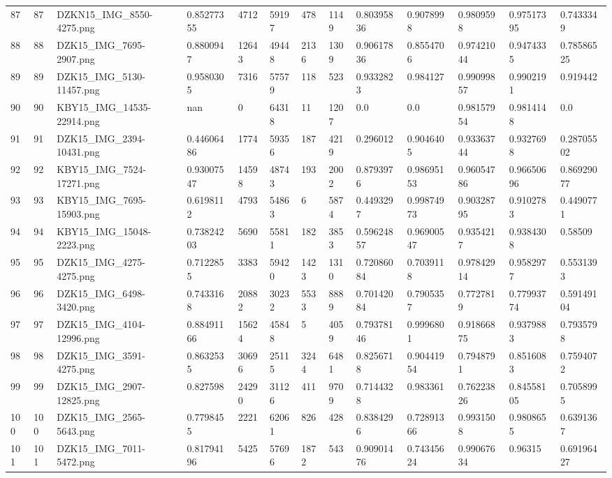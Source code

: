 \documentclass[11pt, a4paper, twoside]{report}
\begin{document}
\begin{longtable}[c]{@{}lllllllllllll@{}}
87 & 87 & DZKN15\_IMG\_8550-4275.png & 0.85277355 & 4712 & 59197 & 478 & 1149 & 0.80395836 & 0.9078998 & 0.9809598 & 0.97517395 & 0.7433349 \\
88 & 88 & DZK15\_IMG\_7695-2907.png & 0.8800947 & 12643 & 49448 & 2136 & 1309 & 0.90617836 & 0.8554706 & 0.97421044 & 0.9474335 & 0.78586525 \\
89 & 89 & DZK15\_IMG\_5130-11457.png & 0.9580305 & 7316 & 57579 & 118 & 523 & 0.9332823 & 0.984127 & 0.99099857 & 0.9902191 & 0.919442 \\
90 & 90 & KBY15\_IMG\_14535-22914.png & nan & 0 & 64318 & 11 & 1207 & 0.0 & 0.0 & 0.98157954 & 0.9814148 & 0.0 \\
91 & 91 & DZK15\_IMG\_2394-10431.png & 0.44606486 & 1774 & 59356 & 187 & 4219 & 0.296012 & 0.9046405 & 0.93363744 & 0.9327698 & 0.28705502 \\
92 & 92 & KBY15\_IMG\_7524-17271.png & 0.93007547 & 14598 & 48743 & 193 & 2002 & 0.8793976 & 0.98695153 & 0.96054786 & 0.96650696 & 0.86929077 \\
93 & 93 & KBY15\_IMG\_7695-15903.png & 0.6198112 & 4793 & 54863 & 6 & 5874 & 0.4493297 & 0.99874973 & 0.90328795 & 0.9102783 & 0.4490771 \\
94 & 94 & KBY15\_IMG\_15048-2223.png & 0.73824203 & 5690 & 55811 & 182 & 3853 & 0.59624857 & 0.96900547 & 0.9354217 & 0.9384308 & 0.58509 \\
95 & 95 & DZK15\_IMG\_4275-4275.png & 0.7122855 & 3383 & 59420 & 1423 & 1310 & 0.72086084 & 0.7039118 & 0.97842914 & 0.9582977 & 0.5531393 \\
96 & 96 & DZK15\_IMG\_6498-3420.png & 0.7433168 & 20882 & 30232 & 5533 & 8889 & 0.70142084 & 0.7905357 & 0.7727819 & 0.77993774 & 0.59149104 \\
97 & 97 & DZK15\_IMG\_4104-12996.png & 0.88491166 & 15624 & 45848 & 5 & 4059 & 0.79378146 & 0.9996801 & 0.91866875 & 0.9379883 & 0.7935798 \\
98 & 98 & DZK15\_IMG\_3591-4275.png & 0.8632535 & 30696 & 25115 & 3244 & 6481 & 0.8256718 & 0.90441954 & 0.7948791 & 0.8516083 & 0.7594072 \\
99 & 99 & DZK15\_IMG\_2907-12825.png & 0.827598 & 24290 & 31126 & 411 & 9709 & 0.7144328 & 0.983361 & 0.76223826 & 0.84558105 & 0.7058995 \\
100 & 100 & DZK15\_IMG\_2565-5643.png & 0.7798455 & 2221 & 62061 & 826 & 428 & 0.8384296 & 0.72891366 & 0.9931508 & 0.9808655 & 0.6391367 \\
101 & 101 & DZK15\_IMG\_7011-5472.png & 0.81794196 & 5425 & 57696 & 1872 & 543 & 0.90901476 & 0.74345624 & 0.99067634 & 0.96315 & 0.69196427 \\

\end{longtable}
\end{document}
